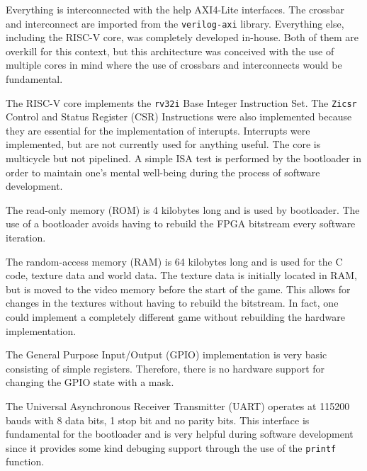 \documentclass[12pt,a4paper]{article}
\begin{document}
Everything is interconnected with the help AXI4-Lite interfaces. The crossbar
and interconnect are imported from the \texttt{verilog-axi} library.
Everything else, including the RISC-V core, was completely developed in-house.
Both of them are overkill for this context, but this architecture was conceived
with the use of multiple cores in mind where the use of crossbars and
interconnects would be fundamental.

The RISC-V core implements the \texttt{rv32i} Base Integer Instruction Set. The 
\texttt{Zicsr} Control and Status Register (CSR) Instructions were also
implemented because they are essential for the implementation of interupts. 
Interrupts were implemented, but are not currently used for anything useful.
The core is multicycle but not pipelined. A simple ISA test is performed by the
bootloader in order to maintain one's mental well-being during the process of
software development.

The read-only memory (ROM) is 4 kilobytes long and is used by bootloader. The
use of a bootloader avoids having to rebuild the FPGA bitstream every software
iteration.

The random-access memory (RAM) is 64 kilobytes long and is used for the C code,
texture data and world data. The texture data is initially located in RAM, but
is moved to the video memory before the start of the game. This allows for 
changes in the textures without having to rebuild the bitstream. In fact, one
could implement a completely different game without rebuilding the hardware 
implementation.

The General Purpose Input/Output (GPIO) implementation is very basic consisting
of simple registers. Therefore, there is no hardware support for changing the 
GPIO state with a mask.

The Universal Asynchronous Receiver Transmitter (UART) operates at 115200 bauds
with 8 data bits, 1 stop bit and no parity bits. This interface is fundamental
for the bootloader and is very helpful during software development since it
provides some kind debuging support through the use of the \texttt{printf}
function.
\end{document}
